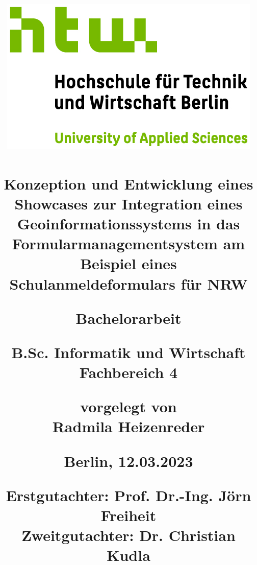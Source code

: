 \begin{titlepage}

\title{
\date{}
\vspace*{-50mm} 
{\includegraphics{images/HTW_Logo_rgb.jpg}}\\

\vspace{1.2cm}
\hrulefill 
\vspace{0.5cm}
\textcolor{htwgreen}{
{\textbf{\Large \\ Konzeption und Entwicklung eines Showcases zur Integration eines Geoinformationssystems in das Formularmanagementsystem am Beispiel eines Schulanmeldeformulars für NRW}}}\\
\hrulefill 
\vspace{0.5cm}

{\large Bachelorarbeit}

\vspace{1.2cm}

{\large B.Sc. Informatik und Wirtschaft}\\
{\large Fachbereich 4}\\


\vspace{5mm}

{\normalsize vorgelegt von}\\

{\large Radmila Heizenreder}\\

\vspace{20mm} 


\begin{minipage}[b]{\textwidth}

    \centering
        \normalsize
    Berlin, 12.03.2023\\
    \vspace{1cm}

    \large Erstgutachter: Prof. Dr.-Ing. Jörn Freiheit \\

    \large Zweitgutachter:  Dr. Christian Kudla \\
\end{minipage}
\vspace{-100mm}
}

\maketitle
\end{titlepage}